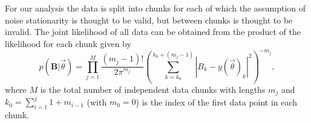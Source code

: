 For our analysis the data is split into chunks for each of which the assumption of noise stationarity is
thought to be valid, but between chunks is thought to be invalid. The joint likelihood of all data can be
obtained from the product of the likelihood for each chunk given by
\begin{equation}\label{eq:prod}
p(\mathbf{B}|\vec{\theta}) = \prod_{j=1}^M \frac{(m_j-1)!}{2\pi^{m_j}}
\left(\sum_{k=k_0}^{k_0+(m_j-1)} |B_k-y(\vec{\theta})_k|^2\right)^{-m_j},
\end{equation}
where $M$ is the total number of independent data chunks with lengths $m_j$ and $k_0 = \sum_{i=1}^{j}
1+m_{i-1}$ (with $m_0 = 0$) is the index of the first data point in each chunk.

  
  
